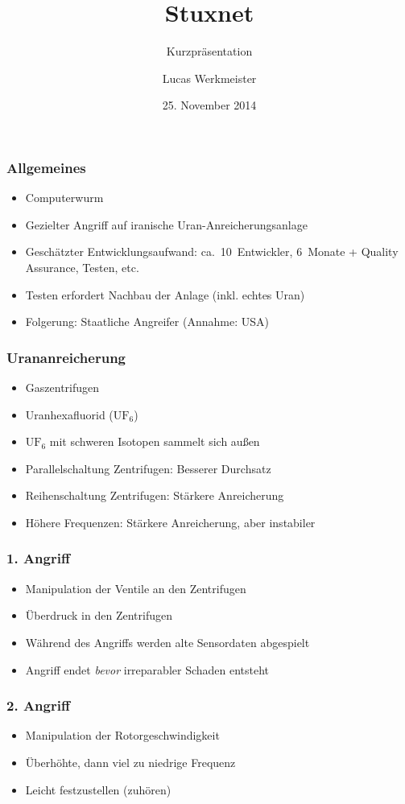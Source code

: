 \documentclass{beamer}
\title{Stuxnet}
\subtitle{Kurzpräsentation}
\author{Lucas Werkmeister}
\date{25. November 2014}
\begin{document}
\newcommand{\ufsechs}[0]{$\mathrm{UF_6}$\xspace}

\begin{frame}
  \titlepage
\end{frame}

\begin{frame}
  \frametitle{Allgemeines}
  \begin{itemize}
    \item Computerwurm
    \item Gezielter Angriff auf iranische Uran-Anreicherungsanlage
    \item Geschätzter Entwicklungsaufwand: ca.~10~Entwickler, 6~Monate + Quality Assurance, Testen, etc.
    \item Testen erfordert Nachbau der Anlage (inkl. echtes Uran)
    \item Folgerung: Staatliche Angreifer (Annahme: USA)
  \end{itemize}
\end{frame}

\begin{frame}
  \frametitle{Urananreicherung}
  \begin{itemize}
    \item Gaszentrifugen
    \item Uranhexafluorid (\ufsechs)
    \item \ufsechs mit schweren Isotopen sammelt sich außen
    \item Parallelschaltung Zentrifugen: Besserer Durchsatz
    \item Reihenschaltung Zentrifugen: Stärkere Anreicherung
    \item Höhere Frequenzen: Stärkere Anreicherung, aber instabiler
  \end{itemize}
\end{frame}

\begin{frame}
  \frametitle{1. Angriff}
  \begin{itemize}
    \item Manipulation der Ventile an den Zentrifugen
    \item Überdruck in den Zentrifugen
    \item Während des Angriffs werden alte Sensordaten abgespielt
    \item Angriff endet \emph{bevor} irreparabler Schaden entsteht
  \end{itemize}
\end{frame}

\begin{frame}
  \frametitle{2. Angriff}
  \begin{itemize}
    \item Manipulation der Rotorgeschwindigkeit
    \item Überhöhte, dann viel zu niedrige Frequenz
    \item Leicht festzustellen (zuhören)
  \end{itemize}
\end{frame}
\end{document}

